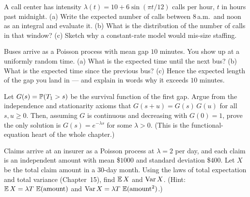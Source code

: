 \begin{exercise}
\label{ch25:exr-nonhomog}
A call center has intensity $\lambda(t) = 10 + 6\sin(\pi t/12)$ calls per hour,
$t$ in hours past midnight. (a) Write the expected number of calls between
$8$\,a.m.\ and noon as an integral and evaluate it. (b) What is the distribution
of the number of calls in that window? (c) Sketch why a constant-rate model would
mis-size staffing.
\end{exercise}

\begin{exercise}
\label{ch25:exr-inspection}
Buses arrive as a Poisson process with mean gap $10$ minutes. You show up at a
uniformly random time. (a) What is the expected time until the next bus? (b) What
is the expected time since the previous bus? (c) Hence the expected length of the
gap you land in --- and explain in words why it exceeds $10$ minutes.
\end{exercise}

\begin{exercise}
\label{ch25:exr-proof}
Let $G(s) = \P(T_1 > s)$ be the survival function of the first gap. Argue from
the independence and stationarity axioms that
$G(s+u) = G(s)\,G(u)$ for all $s,u\ge 0$. Then, assuming $G$ is continuous and
decreasing with $G(0)=1$, prove the only solution is $G(s) = e^{-\lambda s}$ for
some $\lambda > 0$. (This is the functional-equation heart of the whole chapter.)
\end{exercise}

\begin{exercise}
\label{ch25:exr-compound}
Claims arrive at an insurer as a Poisson process at $\lambda = 2$ per day, and
each claim is an independent amount with mean \$$1000$ and standard deviation
\$$400$. Let $X$ be the total claim amount in a $30$-day month. Using the laws of
total expectation and total variance (Chapter~15), find $\E X$ and $\Var X$.
(Hint: $\E X = \lambda T\,\E(\text{amount})$ and
$\Var X = \lambda T\,\E(\text{amount}^2)$.)
\end{exercise}
